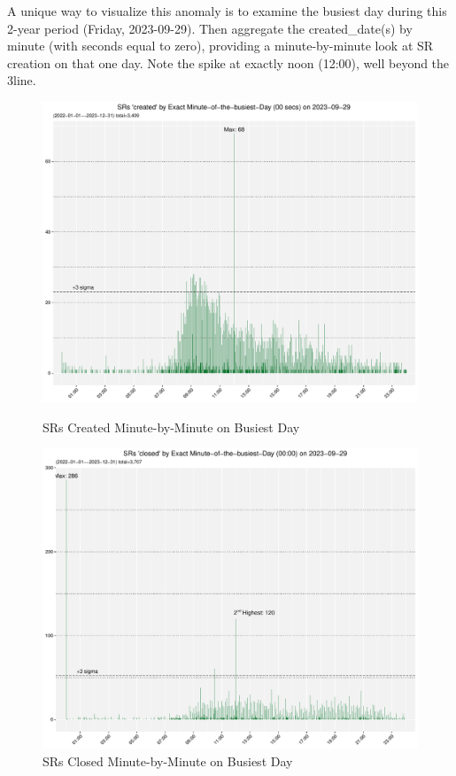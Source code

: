\documentclass[linenumber]{jdsart}
\begin{document}
A unique way to visualize this anomaly is to examine the busiest day 
during this 2-year period (Friday, 2023-09-29). Then aggregate 
the created\_date(s) by minute (with seconds equal to zero), providing
a minute-by-minute look at SR creation on that one day. Note the spike 
at exactly noon (12:00), well beyond the 3\textsigma line.


\begin{figure}[tbp]
    \centering
    \begin{minipage}{0.5\textwidth}
        \centering
        \includegraphics[width=\textwidth]{2-year-trend_SR_created_by_minute_of_busiest_day.pdf}
        \caption{SRs Created Minute-by-Minute on Busiest Day}
        \label{fig:busiestcreated}
    \end{minipage}%
    \begin{minipage}{0.5\textwidth}
        \centering
        \includegraphics[width=\textwidth]{2-year-trend-SR_closed_by_minute_of_busiest_day.pdf}
        \caption{SRs Closed Minute-by-Minute on Busiest Day}
        \label{fig:busiestclosed}
    \end{minipage}
\end{figure}
\end{document}
